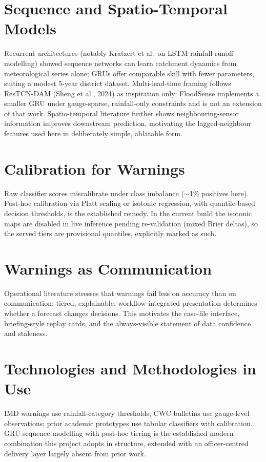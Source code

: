 \documentclass[a4paper,12pt]{report}
\begin{document}
\section{Sequence and Spatio-Temporal Models}
Recurrent architectures (notably Kratzert et al.\ on LSTM rainfall-runoff modelling) showed sequence networks can learn catchment dynamics from meteorological series alone; GRUs offer comparable skill with fewer parameters, suiting a modest 5-year district dataset. Multi-lead-time framing follows ResTCN-DAM (Sheng et al., 2024) as inspiration only: FloodSense implements a smaller GRU under gauge-sparse, rainfall-only constraints and is not an extension of that work. Spatio-temporal literature further shows neighbouring-sensor information improves downstream prediction, motivating the lagged-neighbour features used here in deliberately simple, ablatable form.

\section{Calibration for Warnings}
Raw classifier scores miscalibrate under class imbalance ($\sim$1\% positives here). Post-hoc calibration via Platt scaling or isotonic regression, with quantile-based decision thresholds, is the established remedy. In the current build the isotonic maps are disabled in live inference pending re-validation (mixed Brier deltas), so the served tiers are provisional quantiles, explicitly marked as such.

\section{Warnings as Communication}
Operational literature stresses that warnings fail less on accuracy than on communication: tiered, explainable, workflow-integrated presentation determines whether a forecast changes decisions. This motivates the case-file interface, briefing-style replay cards, and the always-visible statement of data confidence and staleness.

\section{Technologies and Methodologies in Use}
IMD warnings use rainfall-category thresholds; CWC bulletins use gauge-level observations; prior academic prototypes use tabular classifiers with calibration. GRU sequence modelling with post-hoc tiering is the established modern combination this project adopts in structure, extended with an officer-centred delivery layer largely absent from prior work.
\end{document}
